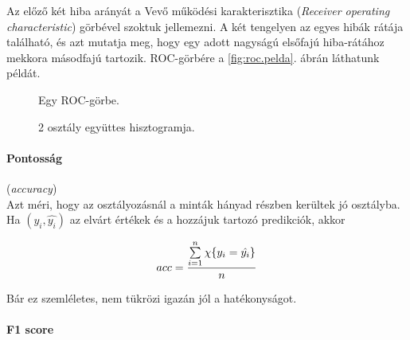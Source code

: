 



Az előző két hiba arányát a Vevő működési karakterisztika \cite{rocanalysis} (\textit{Receiver operating characteristic}) görbével szoktuk jellemezni. A két tengelyen az egyes hibák rátája található, és azt mutatja meg, hogy egy adott nagyságú elsőfajú hiba-rátához mekkora másodfajú tartozik. ROC-görbére a \ref{fig:roc.pelda}. ábrán láthatunk példát.


\begin{figure}[h!]
	
	
	\begin{minipage}[c]{0.5\linewidth}
		\centering
		
		\caption{Egy ROC-görbe.}
		\label{fig:roc.pelda}
		
	\end{minipage}\hfill
	\begin{minipage}[c]{0.5\linewidth}
		\centering
		
		\caption{2 osztály együttes hisztogramja.}
		\label{fig:hist.pelda}
		
	\end{minipage}
	
\end{figure}



\paragraph{Pontosság} (\textit{accuracy}) \\
Azt méri, hogy az osztályozásnál a minták hányad részben
kerültek jó osztályba.
Ha $ (y_i, \hat{y_i}) $ az elvárt értékek és a hozzájuk tartozó 
predikciók, akkor

\[  acc = \dfrac{\sum\limits_{{i}=1}^{n} \chi\{y_i = \hat{y_i}\}}{n}  \]

\noindent
Bár ez szemléletes, nem tükrözi igazán jól a hatékonyságot.


\paragraph{F1 score} \mbox{} 

